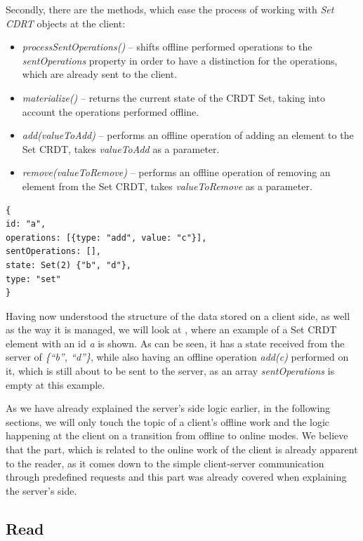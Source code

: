 Secondly, there are the methods, which ease the process of working with \textit{Set CDRT} objects at the client: 

         \begin{itemize}
         \item \textit{processSentOperations()} -- shifts offline performed operations to the \textit{sentOperations} property in order to have a distinction for the operations, which are already sent to the client.
         \item \textit{materialize()} -- returns the current state of the CRDT Set, taking into account the operations performed offline.
         \item \textit{add(valueToAdd)} -- performs an offline operation of adding an element to the Set CRDT, takes \textit{valueToAdd} as a parameter.
          \item \textit{remove(valueToRemove)} -- performs an offline operation of removing an element from the Set CRDT, takes \textit{valueToRemove} as a parameter.
     \end{itemize}

\begin{lstlisting}[caption={An example of a \textit{SetCRDT} object, stored on a client side.}, label={lst:dev8}]
{
id: "a",
operations: [{type: "add", value: "c"}],
sentOperations: [],
state: Set(2) {"b", "d"},
type: "set"
}
\end{lstlisting}
     
Having now understood the structure of the data stored on a client side, as well as the way it is managed, we will look at , where an example of a Set CRDT element with an id \textit{a} is shown. As can be seen, it has a state received from the server of \textit{\{``b'', ``d''\}}, while also having an offline operation \textit{add(c)} performed on it, which is still about to be sent to the server, as an array \textit{sentOperations} is empty at this example.

As we have already explained the server's side logic earlier, in the following sections, we will only touch the topic of a client's offline work and the logic happening at the client on a transition from offline to online modes. We believe that the part, which is related to the online work of the client is already apparent to the reader, as it comes down to the simple client-server communication through predefined requests and this part was already covered when explaining the server's side. 

\subsection*{Read}

